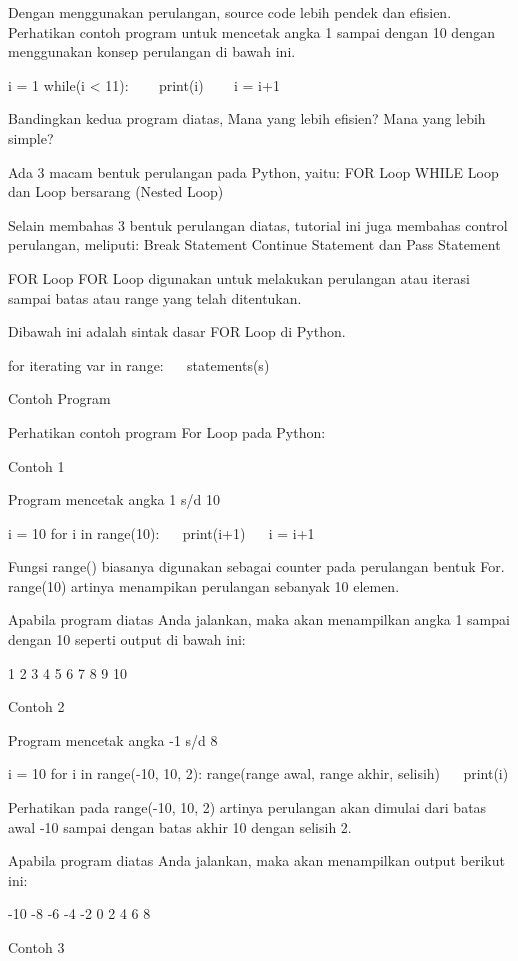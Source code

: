 Dengan menggunakan perulangan, source code lebih pendek dan efisien. Perhatikan contoh program untuk mencetak angka 1 sampai dengan 10 dengan menggunakan konsep perulangan di bawah ini.

 

i = 1 
while(i < 11): 
~~~ print(i) 
~~~ i = i+1 

Bandingkan kedua program diatas, Mana yang lebih efisien? Mana yang lebih simple?

Ada 3 macam bentuk perulangan pada Python, yaitu: 
FOR Loop 
WHILE Loop 
dan Loop bersarang (Nested Loop) 

Selain membahas 3 bentuk perulangan diatas, tutorial ini juga membahas control perulangan, meliputi: 
Break Statement 
Continue Statement 
dan Pass Statement 


FOR Loop 
FOR Loop digunakan untuk melakukan perulangan atau iterasi sampai batas atau range yang telah ditentukan.

Dibawah ini adalah sintak dasar FOR Loop di Python.

 
for iterating     var in range: 
~~ statements(s) 

Contoh Program

Perhatikan contoh program For Loop pada Python:

Contoh 1

 
Program mencetak angka 1 s/d 10 

i = 10 
for i in range(10): 
~~ print(i+1) 
~~ i = i+1 

Fungsi   range()   biasanya digunakan sebagai counter pada perulangan bentuk For. range(10) artinya menampikan perulangan sebanyak 10 elemen.

Apabila program diatas Anda jalankan, maka akan menampilkan angka 1 sampai dengan 10 seperti output di bawah ini:

 
1 
2 
3 
4 
5 
6 
7 
8 
9 
10 

Contoh 2

 
 Program mencetak angka -1 s/d 8 

i = 10 
for i in range(-10, 10, 2):       range(range awal, range akhir, selisih) 
~~ print(i) 


Perhatikan pada range(-10, 10, 2) artinya perulangan akan dimulai dari batas awal -10 sampai dengan batas akhir 10 dengan selisih 2.

Apabila program diatas Anda jalankan, maka akan menampilkan output berikut ini:

 
-10 
-8 
-6 
-4 
-2 
0 
2 
4 
6 
8 

Contoh 3

